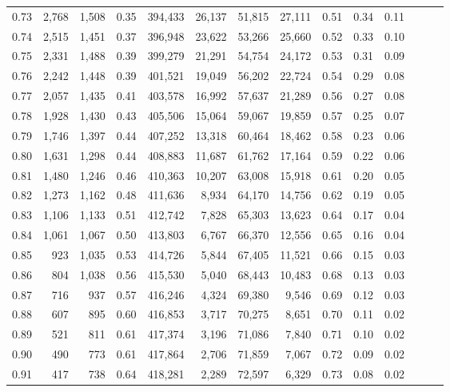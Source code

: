 \begin{tabular}{rrrrrrrrrrrrrr}
0.73 &  2,768 &  1,508 &  0.35 &  394,433 &   26,137 &  51,815 &  27,111 &  0.51 &  0.34 &      0.11 \\
0.74 &  2,515 &  1,451 &  0.37 &  396,948 &   23,622 &  53,266 &  25,660 &  0.52 &  0.33 &      0.10 \\
0.75 &  2,331 &  1,488 &  0.39 &  399,279 &   21,291 &  54,754 &  24,172 &  0.53 &  0.31 &      0.09 \\
0.76 &  2,242 &  1,448 &  0.39 &  401,521 &   19,049 &  56,202 &  22,724 &  0.54 &  0.29 &      0.08 \\
0.77 &  2,057 &  1,435 &  0.41 &  403,578 &   16,992 &  57,637 &  21,289 &  0.56 &  0.27 &      0.08 \\
0.78 &  1,928 &  1,430 &  0.43 &  405,506 &   15,064 &  59,067 &  19,859 &  0.57 &  0.25 &      0.07 \\
0.79 &  1,746 &  1,397 &  0.44 &  407,252 &   13,318 &  60,464 &  18,462 &  0.58 &  0.23 &      0.06 \\
0.80 &  1,631 &  1,298 &  0.44 &  408,883 &   11,687 &  61,762 &  17,164 &  0.59 &  0.22 &      0.06 \\
0.81 &  1,480 &  1,246 &  0.46 &  410,363 &   10,207 &  63,008 &  15,918 &  0.61 &  0.20 &      0.05 \\
0.82 &  1,273 &  1,162 &  0.48 &  411,636 &    8,934 &  64,170 &  14,756 &  0.62 &  0.19 &      0.05 \\
0.83 &  1,106 &  1,133 &  0.51 &  412,742 &    7,828 &  65,303 &  13,623 &  0.64 &  0.17 &      0.04 \\
0.84 &  1,061 &  1,067 &  0.50 &  413,803 &    6,767 &  66,370 &  12,556 &  0.65 &  0.16 &      0.04 \\
0.85 &    923 &  1,035 &  0.53 &  414,726 &    5,844 &  67,405 &  11,521 &  0.66 &  0.15 &      0.03 \\
0.86 &    804 &  1,038 &  0.56 &  415,530 &    5,040 &  68,443 &  10,483 &  0.68 &  0.13 &      0.03 \\
0.87 &    716 &    937 &  0.57 &  416,246 &    4,324 &  69,380 &   9,546 &  0.69 &  0.12 &      0.03 \\
0.88 &    607 &    895 &  0.60 &  416,853 &    3,717 &  70,275 &   8,651 &  0.70 &  0.11 &      0.02 \\
0.89 &    521 &    811 &  0.61 &  417,374 &    3,196 &  71,086 &   7,840 &  0.71 &  0.10 &      0.02 \\
0.90 &    490 &    773 &  0.61 &  417,864 &    2,706 &  71,859 &   7,067 &  0.72 &  0.09 &      0.02 \\
0.91 &    417 &    738 &  0.64 &  418,281 &    2,289 &  72,597 &   6,329 &  0.73 &  0.08 &      0.02 \\

\end{tabular}
